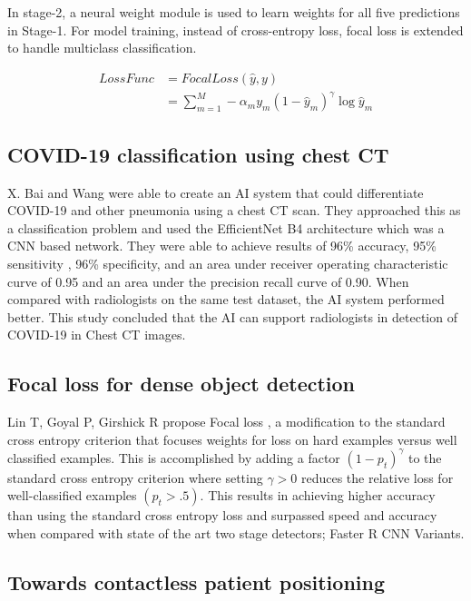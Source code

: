 \documentclass{sigkddExp}
\begin{document}
In stage-2, a neural weight module is used to learn weights for all five predictions in Stage-1.
For model training, instead of cross-entropy loss, focal loss is extended to handle
multiclass classification.

\begin{align}
    LossFunc &=FocalLoss(\hat{y},y) \\
    &=\sum_{m=1}^{M} - \alpha_m y_m (1-\hat{y}_m)^\gamma \log{\hat{y}_m}
\end{align}

\subsection{COVID-19 classification using chest CT}

X. Bai and Wang \cite{pmid32339081} were able to create an AI system that could
differentiate COVID-19 and other pneumonia using a chest CT scan. They
approached this as a classification problem and used the EfficientNet B4
architecture which was a CNN based network. They were able to achieve results of
96\% accuracy, 95\% sensitivity , 96\% specificity, and an area under receiver
operating characteristic curve of 0.95 and an area under the precision recall
curve of 0.90. When compared with radiologists on the same test dataset, the AI
system performed better. This study concluded that the AI can support
radiologists in detection of COVID-19 in Chest CT images.

\subsection{Focal loss for dense object detection}

Lin T, Goyal P, Girshick R propose Focal loss \cite{lin2018focal}, a
modification to the standard cross entropy criterion that focuses weights for
loss on hard examples versus well classified examples. This is accomplished by
adding a factor $(1 - p_t)^\gamma$ to the standard cross entropy criterion where
setting $\gamma  > 0$ reduces the relative loss for well-classified examples
$(p_t > .5)$. This results in achieving higher accuracy than using the standard
cross entropy loss and surpassed speed and accuracy when compared with state of
the art two stage detectors; Faster R CNN Variants.


\subsection{Towards contactless patient positioning}
\end{document}
